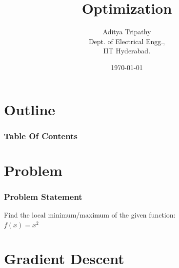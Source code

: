 \documentclass{beamer}
\title{Optimization}
\author{Aditya Tripathy\\ Dept. of Electrical Engg.,\\IIT Hyderabad.}
\date{\today}
\providecommand{\brak}[1]{\ensuremath{\left(#1\right)}}
\theoremstyle{remark}
\newcommand{\myvec}[1]{\ensuremath{\begin{pmatrix}#1\end{pmatrix}}}
\let\vec\mathbf
\numberwithin{equation}{section}
\begin{document}
\begin{frame}
\titlepage
\end{frame}

\section*{Outline}
\begin{frame}
\frametitle{Table Of Contents}
\tableofcontents
\end{frame}
\section{Problem}
\begin{frame}
\frametitle{Problem Statement}
%
Find the local minimum/maximum of the given function:\\
$f\brak{x} = x^2$
\end{frame}

\section{Gradient Descent}
\end{document}
